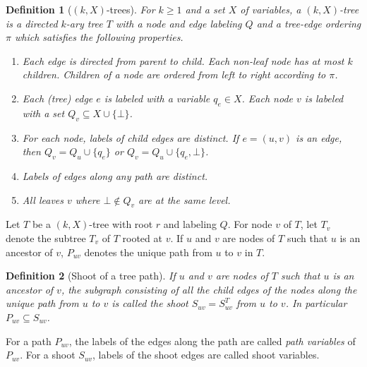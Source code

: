 \documentclass[10pt,a4paper]{article}
\newtheorem{definition}{Definition}
\begin{document}
\begin{definition}[$(k,X)$-trees]
For $k\geq 1$ and  a set $X$ of variables, a $(k,X)$-tree
is a directed $k$-ary tree $T$ 
with a node and edge labeling $Q$ and a tree-edge ordering $\pi$
which satisfies the following properties.
\begin{enumerate}
\item Each edge  is directed from parent to child.
Each non-leaf node has at most $k$ children. Children of a node
are ordered from left to right according to $\pi$.
\item 
Each (tree) edge $e$ is labeled with a variable $q_e\in X$.
Each node $v$ is labeled with a set $Q_v \subseteq X\cup\{\bot\}$.

\item 
For each node, labels of child edges are distinct.
If $e= (u,v)$ is an edge, then 
$Q_v = Q_u\cup \{q_e\}$ or
$Q_v = Q_u\cup \{q_e, \bot\}$.
\item
Labels of  edges along any path are distinct.
\item All leaves $v$ where $\bot\notin Q_v$ 
are at the same level.
\end{enumerate}
\end{definition}
Let $T$ be a $(k,X)$-tree with root $r$ and labeling $Q$.
For node $v$ of $T$, 
let $T_v$ denote the subtree $T_v$ of $T$ rooted at $v$.
If $u$ and $v$ are nodes of $T$ 
such that $u$ is an ancestor of $v$, $P_{uv}$ denotes the unique 
path from $u$ to $v$ in $T$.



\begin{definition}[Shoot of a tree path]
If $u$ and $v$ are nodes of $T$ such that $u$ is an ancestor of $v$, the subgraph consisting of all the child edges of the nodes 
along the unique path from $u$ to $v$ is called the \emph{shoot} $S_{uv} = S^T_{uv}$ from $u$ to $v$. In particular $P_{uv} \subseteq S_{uv}$.
\end{definition}

For a path $P_{uv}$, the labels of the  edges along the path are called \emph{path variables} of $P_{uv}$.
For a shoot $S_{uv}$, labels of the shoot edges are called shoot variables.
\end{document}
